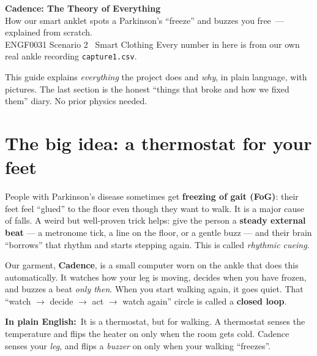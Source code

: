 \documentclass[11pt]{article}
\newcommand{\pe}{\textbf{\color{teal}In plain English:}\ }
\begin{document}
\begin{tcolorbox}[enhanced, colback=teal, colframe=teal, arc=4pt,
  left=16pt, right=16pt, top=13pt, bottom=13pt, boxrule=0pt]
  {\color{white}\Huge\bfseries Cadence: The Theory of Everything}\\[5pt]
  {\color{white}\large How our smart anklet spots a Parkinson's ``freeze'' and
   buzzes you free \,---\, explained from scratch.}\\[8pt]
  {\color{tealbg}\footnotesize ENGF0031 Scenario 2 \textbullet\ Smart Clothing
   \quad\textbullet\quad Every number in here is from our own real ankle
   recording \texttt{capture1.csv}.}
\end{tcolorbox}

\vspace{2pt}
\noindent\small This guide explains \emph{everything} the project does and
\emph{why}, in plain language, with pictures. The last section is the honest
``things that broke and how we fixed them'' diary. No prior physics needed.
\normalsize

\section{The big idea: a thermostat for your feet}

People with Parkinson's disease sometimes get \textbf{freezing of gait (FoG)}:
their feet feel ``glued'' to the floor even though they want to walk. It is a
major cause of falls. A weird but well-proven trick helps: give the person a
\textbf{steady external beat} --- a metronome tick, a line on the floor, or a
gentle buzz --- and their brain ``borrows'' that rhythm and starts stepping
again. This is called \emph{rhythmic cueing}.

Our garment, \textbf{Cadence}, is a small computer worn on the ankle that does
this automatically. It watches how your leg is moving, decides when you have
frozen, and buzzes a beat \emph{only then}. When you start walking again, it
goes quiet. That ``watch $\rightarrow$ decide $\rightarrow$ act $\rightarrow$
watch again'' circle is called a \textbf{closed loop}.

\begin{plain}
\pe It is a thermostat, but for walking. A thermostat senses the temperature
and flips the heater on only when the room gets cold. Cadence senses your
\emph{leg}, and flips a \emph{buzzer} on only when your walking ``freezes''.
\end{plain}
\end{document}
